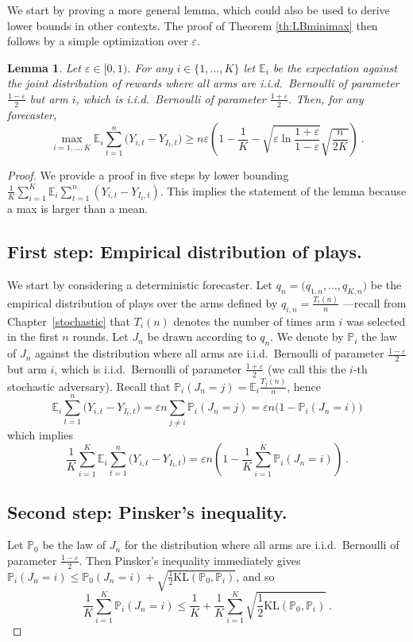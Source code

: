 \documentclass[11pt]{hackednow}
\newtheorem{lemma}{Lemma}[chapter]
\newcommand{\K}{\mathrm{KL}}
\renewcommand{\P}{\mathbb{P}}
\newcommand{\E}{\mathbb{E}}
\renewcommand{\epsilon}{\varepsilon}
\begin{document}
We start by proving a more general lemma, which could also be used to derive lower bounds in other contexts. The proof of Theorem \ref{th:LBminimax} then follows by a simple optimization over $\epsilon$.
%
\begin{lemma} \label{lem:LBminimax}
Let $\epsilon \in [0,1)$. For any $i \in \{1,\hdots, K\}$ let $\E_i$ be the expectation against the joint distribution of rewards where all arms are i.i.d.\ Bernoulli of parameter $\frac{1-\epsilon}{2}$ but arm $i$, which is i.i.d.\ Bernoulli of parameter $\frac{1+\epsilon}{2}$. Then, for any forecaster,
$$\max_{i = 1, \hdots, K}  \E_i \sum_{t=1}^n \bigl(Y_{i,t} - Y_{I_t,t}\bigr) \geq n \epsilon \left(1 - \frac{1}{K} - \sqrt{\epsilon \ln\frac{1+\epsilon}{1-\epsilon}}  \sqrt{\frac{n}{2 K}}\right)~.$$
\end{lemma}
%
\begin{proof}
We provide a proof in five steps by lower bounding $\frac{1}{K} \sum_{i=1}^K \E_i \sum_{t=1}^n (Y_{i,t} - Y_{I_t,t})$. This implies the statement of the lemma because a max is larger than a mean.
%
\subsection*{First step: Empirical distribution of plays.}
%
We start by considering a deterministic forecaster. Let $q_n=\bigl(q_{1,n},\hdots,q_{K,n}\bigr)$ be the empirical distribution of plays over the arms defined by $q_{i,n} = \frac{T_i(n)}{n}$ ---recall from Chapter~\ref{stochastic} that $T_i(n)$ denotes the number of times arm $i$ was selected in the first $n$ rounds. Let $J_n$ be drawn according to $q_n$. We denote by $\P_i$ the law of $J_n$ against the distribution where all arms are i.i.d.\ Bernoulli of parameter $\frac{1-\epsilon}{2}$ but arm $i$, which is i.i.d.\ Bernoulli of parameter $\frac{1+\epsilon}{2}$ (we call this the $i$-th stochastic adversary). Recall that $\P_{i}(J_n = j) = \E_i\tfrac{T_j(n)}{n}$, hence
$$\E_i \sum_{t=1}^n \bigl(Y_{i,t} - Y_{I_t,t}\bigr) = \epsilon n \sum_{j \neq i} \P_{i}(J_n = j) = \epsilon n \bigl(1 - \P_{i}(J_n = i)\bigr)$$
which implies
\begin{equation} \label{eq:firststepmm}
\frac{1}{K} \sum_{i=1}^K \E_i \sum_{t=1}^n \bigl(Y_{i,t} - Y_{I_t,t}\bigr) = \epsilon n \left(1 - \frac{1}{K} \sum_{i=1}^K \P_{i}(J_n = i)\right)~.
\end{equation}

\subsection*{Second step: Pinsker's inequality.}
%
Let $\P_0$ be the law of $J_n$ for the distribution where all arms are i.i.d.\ Bernoulli of parameter $\frac{1-\epsilon}{2}$. Then Pinsker's inequality immediately gives $\P_{i}(J_n = i) \le \P_{0}(J_n = i) + \sqrt{\tfrac{1}{2} \K(\P_{0},\P_{i})}$, and so
\begin{equation} \label{eq:secondstepmm}
\frac{1}{K} \sum_{i=1}^K \P_{i}(J_n = i) \leq \frac{1}{K} +  \frac{1}{K} \sum_{i=1}^K \sqrt{\frac{1}{2} \K(\P_{0}, \P_{i})}~.
\end{equation}


\end{proof}
\end{document}
